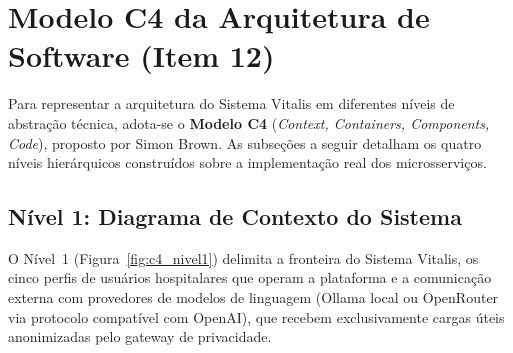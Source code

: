 
\section{Modelo C4 da Arquitetura de Software (Item 12)}
\label{sec:modelo_c4}

Para representar a arquitetura do Sistema Vitalis em diferentes níveis de abstração técnica, adota-se o \textbf{Modelo C4} (\textit{Context, Containers, Components, Code}), proposto por Simon Brown. As subseções a seguir detalham os quatro níveis hierárquicos construídos sobre a implementação real dos microsserviços.

\subsection{Nível 1: Diagrama de Contexto do Sistema}
\label{subsec:c4_contexto}

O Nível~1 (Figura~\ref{fig:c4_nivel1}) delimita a fronteira do Sistema Vitalis, os cinco perfis de usuários hospitalares que operam a plataforma e a comunicação externa com provedores de modelos de linguagem (Ollama local ou OpenRouter via protocolo compatível com OpenAI), que recebem exclusivamente cargas úteis anonimizadas pelo gateway de privacidade.

